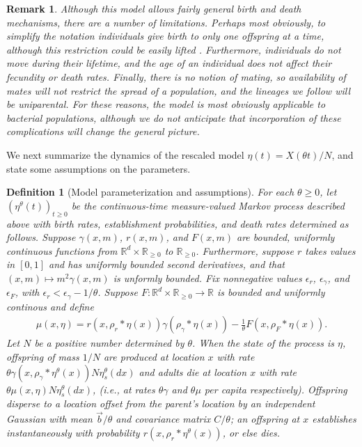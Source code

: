 \documentclass[12pt]{article}
\newtheorem{remark}[theorem]{Remark}
\newtheorem{definition}[theorem]{Definition}
\newcommand{\IR}{\mathbb R}
\newcommand{\meanq}{\vec b}    %
\newcommand{\covq}{C}     %
\newcommand{\kernel}{\rho}  %
\newcommand{\smooth}[1]{\kernel_{#1} \! * \!}  %
\begin{document}
\begin{remark}
Although this model allows fairly general birth and death mechanisms,
there are a number of limitations.
Perhaps most obviously, to simplify the notation
individuals give birth to only one offspring at a time,
although this restriction could be easily lifted
\citep[as in][]{etheridge/kurtz:2018}.
Furthermore, individuals do not move during their lifetime,
and the age of an individual does not affect their fecundity or death rates.
Finally, there is no notion of mating,
so availability of mates will not restrict the spread of a population,
and the lineages we follow will be uniparental.
For these reasons, the model is most obviously applicable to bacterial populations,
although we do not anticipate that incorporation of these complications
will change the general picture.
\end{remark}

We next summarize the dynamics of the rescaled model $\eta(t) = X(\theta t)/N$,
and state some assumptions on the parameters.

\begin{definition}[Model parameterization and assumptions]
    \label{def:model_setup}
    For each $\theta \ge 0$,
    let $\left(\eta^\theta(t)\right)_{t \ge 0}$
    be the continuous-time measure-valued Markov process described above
    with birth rates, establishment probabilities, and death rates
    determined as follows.
    Suppose $\gamma(x, m)$, $r(x, m)$, and $F(x, m)$
    are bounded, uniformly continuous functions
    from $\IR^d \times \IR_{\ge 0}$ to $\IR_{\ge 0}$.
    Furthermore, suppose $r$ takes values in $[0, 1]$
    and has uniformly bounded second derivatives,
    and that $(x, m) \mapsto m^2 \gamma(x, m)$ is unformly bounded.
    Fix nonnegative values $\epsilon_r$, $\epsilon_\gamma$, and $\epsilon_F$,
    with $\epsilon_r < \epsilon_\gamma - 1/\theta$.
    Suppose $F: \IR^d \times \IR_{\ge 0} \to \IR$ is bounded and uniformly continous
    and define
    \begin{align} \label{eqn:mu_defn}
        \mu(x, \eta)
        =
        r(x, \smooth{r} \eta(x))
        \gamma(\smooth{\gamma} \eta(x))
        - \frac{1}{\theta}
        F(x, \smooth{F} \eta(x)) .
    \end{align}
    Let $N$ be a positive number determined by $\theta$.
    When the state of the process is $\eta$,
    offspring of mass $1/N$ are produced at location $x$
    with rate $\theta \gamma(x, \smooth{\gamma} \eta^{\theta}(x)) N \eta^{\theta}_s(dx)$
    and adults die at location $x$ with rate $\theta \mu(x, \eta) N \eta^{\theta}_s(dx)$,
    (i.e., at rates $\theta \gamma$ and $\theta \mu$ per capita respectively).
    Offspring disperse to a location offset from the parent's location
    by an independent Gaussian with mean $\meanq/\theta$
    and covariance matrix $\covq / \theta$;
    an offspring at $x$ establishes instantaneously
    with probability $r(x, \smooth{r} \eta^{\theta}(x))$, or else dies.
\end{definition}
\end{document}
